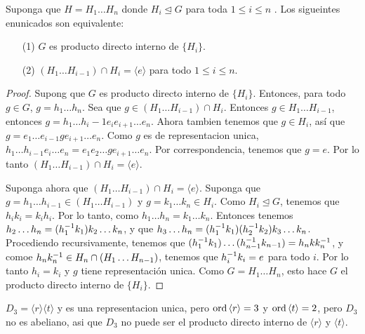 \begin{lemma}\label{lemma_6.22}
    Suponga que $H=H_1 \dots H_n$ donde $H_i \unlhd G$ para toda $1 \leq i \leq
    n$ . Los sigueintes enunicados son equivalente:
    \begin{enumerate}
        \item[(1)] $G$ es producto directo interno de  $\{H_i\}$.

        \item[(2)] $(H_1 \dots H_{i-1}) \cap H_i=\langle e \rangle$ para todo $1
            \leq i \leq n$.
    \end{enumerate}
\end{lemma}
\begin{proof}
    Supong  que $G$ es producto directo interno de  $\{H_i\}$. Entonces, para
    todo $g \in G$,  $g=h_1 \dots h_n$. Sea que $g \in (H_1 \dots H_{i-1}) \cap

    H_i$. Entonces $g \in H_1 \dots H_{i-1}$, entonces $g=h_1 \dots
    h_i-1e_ie_{i+1} \dots e_n$. Ahora tambien tenemos que $g \in H_i$, as\'i que
     $g=e_1 \dots e_{i-1}ge_{i+1} \dots e_n$. Como $g$ es de representacion
     unica, $h_1 \dots h_{i-1}e_i \dots e_n=e_1e_2 \dots ge_{i+1} \dots e_n$.
     Por correspondencia, tenemos que $g=e$. Por lo tanto  $(H_1 \dots H_{i-1})
     \cap H_i=\langle e \rangle$.

     Suponga ahora que $(H_1 \dots H_{i-1}) \cap H_i=\langle e \rangle$.
     Suponga que $g=h_1 \dots h_{i-1} \in (H_1 \dots H_{i-1})$ y $g=k_1 \dots
     k_n \in H_i$. Como $H_i \unlhd G$, tenemos que  $h_ik_i=k_ih_i$. Por lo
     tanto, como  $h_1 \dots h_n=k_1 \dots k_n$. Entonces tenemos $h_2 \dots
     h_n=(h_1^{-1}k_1)k_2 \dots k_n$, y que $h_3 \dots
     h_n=(h_1^{-1}k_1)(h_2^{-1}k_2)k_3 \dots k_n$. Procediendo recursivamente,
     tenemos que  $(h_1^{-1}k_1) \dots (h_{n-1}^{-1}k_{n-1})=h_nkk_n^{-1}$, y
     comoe $h_nk_n^{-1} \in H_n \cap (H_1 \dots H_{n-1})$, tenemos que
     $h_i^{-1}k_i=e$ para todo $i$. Por lo tanto  $h_i=k_i$ y  $g$ tiene
     representaci\'on unica. Como  $G=H_1 \dots H_n$, esto hace $G$ el producto
     directo interno de  $\{H_i\}$.
\end{proof}

\begin{example}\label{}
        $D_3=\langle r \rangle\langle t \rangle$ y es una
        representacion unica, pero $\operatorname{ord}{\langle r \rangle}=3$ y
        $\operatorname{ord}{\langle t \rangle}=2$, pero $D_3$ no es abeliano, asi que
        $D_3$ no puede ser el producto directo interno de $\langle r
        \rangle$ y $\langle t\rangle$.
\end{example}

